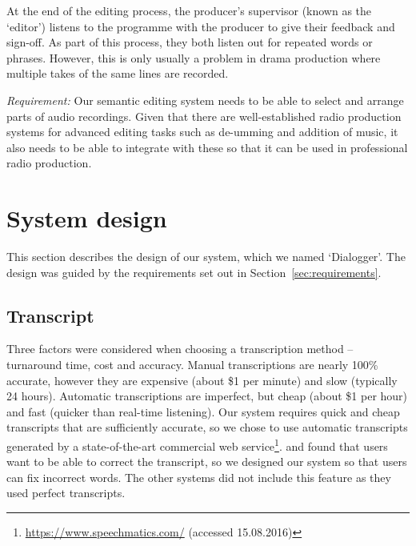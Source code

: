 At the end of the editing process, the producer's supervisor (known as the
`editor') listens to the programme with the producer to give their feedback and
sign-off. As part of this process, they both listen out for repeated words or
phrases. However, this is only usually a problem in drama production where
multiple takes of the same lines are recorded.

\textit{Requirement:} Our semantic editing system needs to be able to select and arrange parts of audio recordings.
Given that there are well-established radio production systems for advanced editing tasks such as de-umming and
addition of music, it also needs to be able to integrate with these so that it can be used in professional radio
production.


%
%
%
%
%
%

\section{System design}\label{sec:screen-design}
This section describes the design of our system, which we named `Dialogger'. The design was guided by the requirements
set out in Section~\ref{sec:requirements}.

\subsection{Transcript}
Three factors were considered when choosing a transcription method -- turnaround time, cost and accuracy. Manual
transcriptions are nearly 100\% accurate, however they are expensive (about \$1 per minute) and slow (typically 24
hours). Automatic transcriptions are imperfect, but cheap (about \$1 per hour) and fast (quicker than real-time
listening). Our system requires quick and cheap transcripts that are sufficiently accurate, so we chose to use automatic
transcripts generated by a state-of-the-art commercial web service\footnote{\url{https://www.speechmatics.com/}
  (accessed 15.08.2016)}.
\citet{Whittaker2004} and \citet{Sivaraman2016} found that users want to be able to correct the transcript, so we
designed our system so that users can fix incorrect words.
The other systems did not include this feature as they used perfect transcripts.

